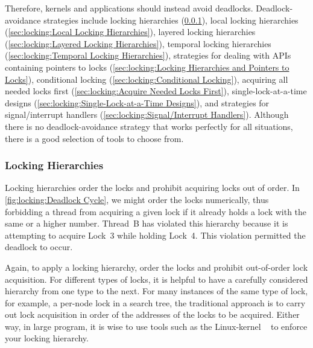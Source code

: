 Therefore, kernels and applications should instead avoid deadlocks.
Deadlock-avoidance strategies include locking hierarchies
(\cref{sec:locking:Locking Hierarchies}),
local locking hierarchies
(\cref{sec:locking:Local Locking Hierarchies}),
layered locking hierarchies
(\cref{sec:locking:Layered Locking Hierarchies}),
temporal locking hierarchies
(\cref{sec:locking:Temporal Locking Hierarchies}),
strategies for dealing with APIs containing pointers to locks
(\cref{sec:locking:Locking Hierarchies and Pointers to Locks}),
conditional locking
(\cref{sec:locking:Conditional Locking}),
acquiring all needed locks first
(\cref{sec:locking:Acquire Needed Locks First}),
single-lock-at-a-time designs
(\cref{sec:locking:Single-Lock-at-a-Time Designs}),
and strategies for signal/interrupt handlers
(\cref{sec:locking:Signal/Interrupt Handlers}).
Although there is no deadlock-avoidance strategy that works perfectly
for all situations, there is a good selection of tools to choose from.

\subsubsection{Locking Hierarchies}
\label{sec:locking:Locking Hierarchies}

Locking hierarchies order the locks and prohibit acquiring locks out
of order.
In \cref{fig:locking:Deadlock Cycle},
we might order the locks numerically, thus forbidding a thread
from acquiring a given lock if it already holds a lock
with the same or a higher number.
Thread~B has violated this hierarchy because it is attempting to
acquire Lock~3 while holding Lock~4.
This violation permitted the deadlock to occur.

Again, to apply a locking hierarchy, order the locks and prohibit
out-of-order lock acquisition.
For different types of locks, it is helpful to have a
carefully considered hierarchy from one type to the next.
For many instances of the same type of lock, for example, a per-node
lock in a search tree, the traditional approach is to carry out lock
acquisition in order of the addresses of the locks to be acquired.
Either way, in large program, it is wise to use tools such as the Linux-kernel
~\cite{JonathanCorbet2006lockdep}
to enforce your locking hierarchy.

